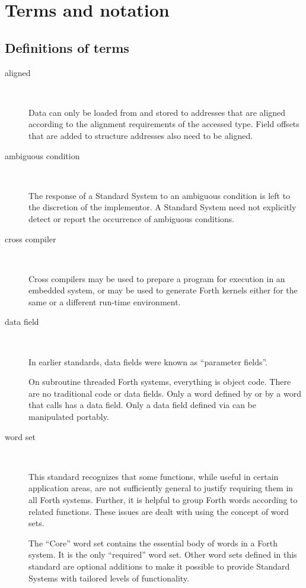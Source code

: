 \section{Terms and notation} %

\subsection{Definitions of terms} %

\begin{description}
\item[aligned]~

Data can only be loaded from and stored to addresses that are aligned
according to the alignment requirements of the accessed type.  Field
offsets that are added to structure addresses also need to be aligned.

\item[ambiguous condition] ~

The response of a Standard System to an ambiguous condition is left
to the discretion of the implementor. A Standard System need not
explicitly detect or report the occurrence of ambiguous conditions.

\item[cross compiler] ~

Cross compilers may be used to prepare a program for execution in an
embedded system, or may be used to generate Forth kernels either for
the same or a different run-time environment.

\item[data field] ~

In earlier standards, data fields were known as ``parameter fields''.

On subroutine threaded Forth systems, everything is object code.
There are no traditional code or data fields. Only a word defined by
 or by a word that calls  has a data field.
Only a data field defined via  can be manipulated portably.

\item[word set] ~

This standard recognizes that some functions, while useful in certain
application areas, are not sufficiently general to justify requiring
them in all Forth systems. Further, it is helpful to group Forth
words according to related functions. These issues are dealt with
using the concept of word sets.

The ``Core'' word set contains the essential body of words in a Forth
system. It is the only ``required'' word set. Other word sets defined
in this standard are optional additions to make it possible to
provide Standard Systems with tailored levels of functionality.
\end{description}

